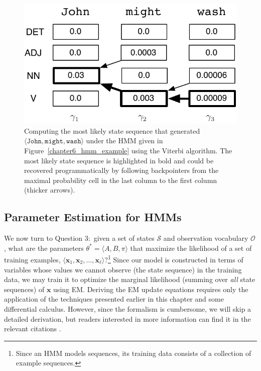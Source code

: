 \begin{figure}[t]
\begin{center}
\vspace{0.2cm}
\includegraphics[scale=0.72]{figures/fig-ch6-q2.pdf}
\vspace{-0.3cm}
\end{center}\caption{Computing the most likely state sequence that generated $\langle \texttt{John} , \texttt{might} , \texttt{wash} \rangle$ under the HMM given in Figure~\ref{chapter6_hmm_example} using the Viterbi algorithm.  The most likely state sequence is highlighted in bold and could be recovered programmatically by following backpointers from the maximal probability cell in the last column to the first column (thicker arrows).}\label{chapter6_fig_question2}
\end{figure}


\subsection{Parameter Estimation for HMMs}
\label{chapter6_forward_backward}

We now turn to Question 3:\ given a set of states $\mathcal{S}$ and
observation vocabulary $\mathcal{O}$, what are the parameters
$\theta^* = \langle A,B,\pi \rangle$ that maximize the likelihood of a
set of training examples, $\langle \textbf{x}_1,\textbf{x}_2,\ldots,
\textbf{x}_{\ell} \rangle$?\footnote{Since an HMM models sequences,
  its training data consists of a collection of example sequences.}
Since our model is constructed in terms of variables whose values we
cannot observe (the state sequence) in the training data, we may train
it to optimize the marginal likelihood (summing over \emph{all} state
sequences) of $\textbf{x}$ using EM.  Deriving the EM update equations
requires only the application of the techniques presented earlier in
this chapter and some differential calculus.  However, since the
formalism is cumbersome, we will skip a detailed derivation, but
readers interested in more information can find it in the relevant
citations \cite{Jelinek_1997,Rabiner_1990}.

